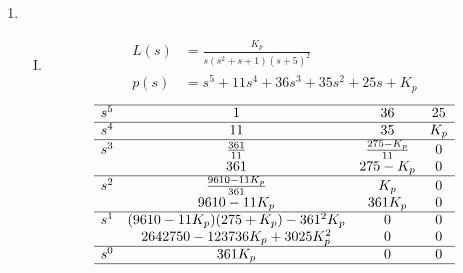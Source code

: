 \begin{ejercicio}
\begin{enumerate}
    \item 
    \begin{enumerate}[I.]
      \item 
        \begin{align*}
          L(s) &= \frac{K_p}{s(s^2+s+1)(s+5)^2}
          \\
          p(s) &= s^5 + 11 s^4 + 36 s^3 + 35 s^2 + 25 s + K_p
        \end{align*}
        \[
          \begin{matrix}
          \hline
          s^5 & 1 & 36 & 25
          \\\hline
          s^4 & 11 & 35 & K_p
          \\\hline
          s^3 & \frac{361}{11} & \frac{275-K_p}{11} & 0
          \\
          & 361 & 275-K_p & 0
          \\\hline
          s^2 & \frac{9610-11K_p}{361} & K_p & 0
          \\
          & 9610-11K_p & 361 K_p & 0
          \\\hline
          s^1 & (9610-11K_p)(275+K_p) - 361^2K_p & 0 & 0
          \\
          & 2642750 - 123736 K_p + 3025K_p^2 & 0 & 0
          \\\hline
          s^0 & 361K_p & 0 & 0
          \\\hline
          \end{matrix}
        \]


\end{enumerate}
\end{enumerate}
\end{ejercicio}

